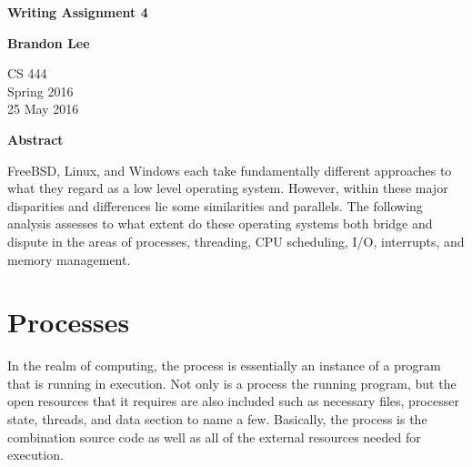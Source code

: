 \documentclass[letterpaper,10pt,titlepage]{article}
\begin{document}
\begin{titlepage}
    \begin{center}
        \vspace*{3.5cm}

        \textbf{Writing Assignment 4}

        \vspace{0.5cm}

        \textbf{Brandon Lee}

        \vspace{0.8cm}

        CS 444\\
        Spring 2016\\
        25 May 2016\\

        \vspace{1cm}

        \textbf{Abstract}\\

        \vspace{0.5cm}

        FreeBSD, Linux, and Windows each take fundamentally different approaches to what they regard as a low level operating system.  However, within these major disparities and differences lie some similarities and parallels.  The following analysis assesses to what extent do these operating systems both bridge and dispute in the areas of processes, threading, CPU scheduling, I/O, interrupts, and memory management.

        \vfill

    \end{center}
\end{titlepage}

\newpage

\tableofcontents

\newpage

\section{Processes}

In the realm of computing, the process is essentially an instance of a program that is running in execution.  Not only is a process the running program, but the open resources that it requires are also included such as necessary files, processer state, threads, and data section to name a few.  Basically, the process is the combination source code as well as all of the external resources needed for execution.
\end{document}
